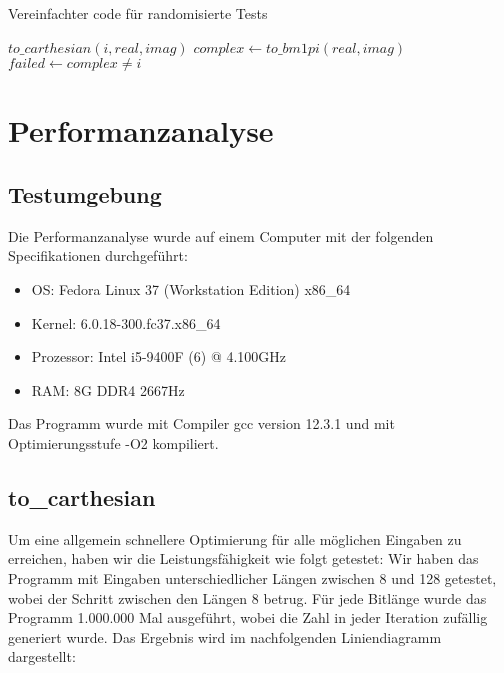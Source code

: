 \documentclass[course=erap]{aspdoc}
\begin{document}
\begin{algorithm}
\caption{Vereinfachter code für randomisierte Tests}
\begin{algorithmic}
 \State $to\_carthesian(i, real, imag)$
 \State $complex \gets to\_bm1pi(real, imag)$
 \State $failed \gets complex \neq i$
\EndFor
\end{algorithmic}
\end{algorithm}

\section{Performanzanalyse}
\subsection{Testumgebung}
Die Performanzanalyse wurde auf einem Computer mit der folgenden Specifikationen durchgef{\"u}hrt:
\begin{itemize}
    \item OS: Fedora Linux 37 (Workstation Edition) x86\_64
    \item Kernel: 6.0.18-300.fc37.x86\_64
    \item Prozessor: Intel i5-9400F (6) @ 4.100GHz
    \item RAM: 8G DDR4 2667Hz
\end{itemize}
Das Programm wurde mit Compiler gcc version 12.3.1 und mit Optimierungsstufe -O2 kompiliert.

\subsection{to\_carthesian}
\noindent
Um eine allgemein schnellere Optimierung für alle möglichen Eingaben zu erreichen, haben wir die Leistungsfähigkeit wie folgt getestet: Wir haben das Programm mit Eingaben unterschiedlicher Längen zwischen 8 und 128 getestet, wobei der Schritt zwischen den Längen 8 betrug. Für jede Bitlänge wurde das Programm 1.000.000 Mal ausgeführt, wobei die Zahl in jeder Iteration zufällig generiert wurde. Das Ergebnis wird im nachfolgenden Liniendiagramm dargestellt:
\end{document}
